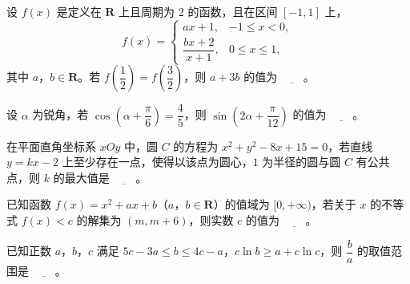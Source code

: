 \begin{question}
设 $f(x)$ 是定义在 $\mathbf R$ 上且周期为 $2$ 的函数，且在区间 $[-1,1]$ 上，
\nopagebreak[4]
\[f(x)=\begin{cases}ax+1,&-1\leqslant x<0,\\[2pt]\dfrac{bx+2}{x+1},&0\leqslant x\leqslant1,\end{cases}\]
其中 $a$，$b\in\mathbf R$。若 $f\left(\dfrac12\right)=f\left(\dfrac32\right)$，则 $a+3b$ 的值为 $\underline{\qquad}$。

\end{question}
\begin{question}
设 $\alpha$ 为锐角，若 $\cos\left(\alpha+\dfrac\pi6\right)=\dfrac45$，则 $\sin\left(2\alpha+\dfrac\pi{12}\right)$ 的值为 $\underline{\qquad}$。

\end{question}
\begin{question}
在平面直角坐标系 $xOy$ 中，圆 $C$ 的方程为 $x^2+y^2-8x+15=0$，若直线 $y=kx-2$ 上至少存在一点，使得以该点为圆心，$1$ 为半径的圆与圆 $C$ 有公共点，则 $k$ 的最大值是 $\underline{\qquad}$。

\end{question}
\begin{question}
已知函数 $f(x)=x^2+ax+b$（$a$，$b\in\mathbf R$）的值域为 $[0,+\infty)$，若关于 $x$ 的不等式 $f(x)<c$ 的解集为 $(m,m+6)$，则实数 $c$ 的值为 $\underline{\qquad}$。

\end{question}
\begin{question}
已知正数 $a$，$b$，$c$ 满足 $5c-3a\leqslant b\leqslant4c-a$，$c\ln b\geqslant a+c\ln c$，则 $\dfrac ba$ 的取值范围是 $\underline{\qquad}$。

\end{question}

